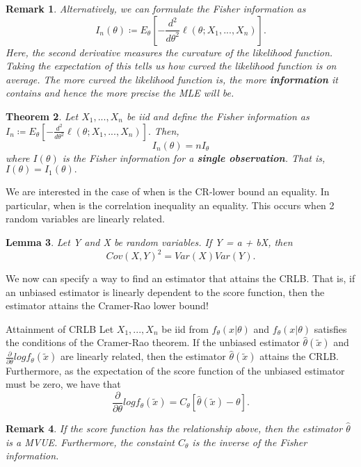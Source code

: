 \documentclass[twoside]{article}
\newcounter{lecnum}
\newtheorem{theorem}{Theorem}[lecnum]
\newtheorem{lemma}[theorem]{Lemma}
\newtheorem{remark}[theorem]{Remark}
\begin{document}
\begin{remark}Alternatively, we can formulate the Fisher information as 
$$
I_n(\theta) \coloneqq E_{\theta}[-\frac{d^2}{d\theta^2}\ell(\theta; X_1,...,X_n)].
$$
Here, the second derivative measures the curvature of the likelihood function. Taking the expectation of this tells us how curved the likelihood function is on average. The more curved the likelihood function is, the more \textbf{information} it contains and hence the more precise the MLE will be.
\end{remark}

\begin{theorem}Let $X_1,...,X_n$ be iid and define the Fisher information as $I_n \coloneqq E_{\theta}[-\frac{d^2}{d\theta^2}\ell(\theta; X_1,...,X_n)].$ Then, 
$$
I_n(\theta) = nI_{\theta}
$$
where $I(\theta)$ is the Fisher information for a \textbf{single observation}. That is, $I(\theta) = I_{1}(\theta).$
\end{theorem}

We are interested in the case of when is the CR-lower bound an equality. In particular, when is the correlation inequality an equality. This occurs when 2 random variables are linearly related.

\begin{lemma}Let Y and X be random variables. If Y = a + bX, then 
$$
Cov(X,Y)^2 = Var(X)Var(Y).
$$
\end{lemma}

We now can specify a way to find an estimator that attains the CRLB. That is, if an unbiased estimator is linearly dependent to the score function, then the estimator attains the Cramer-Rao lower bound!

\begin{theorem_exam}{Attainment of CRLB}{}  Let $X_1,...,X_n$ be iid from $f_{\theta}(x|\theta)$ and $f_{\theta}(x|\theta)$ satisfies the conditions of the Cramer-Rao theorem. If the unbiased estimator $\hat{\theta}(\tilde{x})$ and $\frac{\partial}{\partial \theta}logf_{\theta}(\tilde{x})$ are linearly related, then the estimator $\hat{\theta}(\tilde{x})$ attains the CRLB. \\ Furthermore, as the expectation of the score function of the unbiased estimator must be zero, we have that
$$
\frac{\partial}{\partial \theta}logf_{\theta}(\tilde{x}) = C_{\theta}[\hat{\theta}(\tilde{x}) - \theta].
$$
\end{theorem_exam}

\begin{remark}If the score function has the relationship above, then the estimator $\hat{\theta}$ is a MVUE. Furthermore, the constaint $C_{\theta}$ is the inverse of the Fisher information.
\end{remark}
\end{document}

